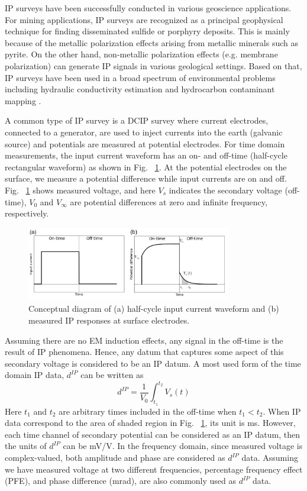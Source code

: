 \documentclass[letterpaper,11pt]{article}
\newcommand{\dip}{d^{IP}}
\begin{document}
IP surveys have been successfully conducted in various geoscience applications. For mining applications, IP surveys are recognized as a principal geophysical technique for finding disseminated sulfide or porphyry deposits. This is mainly because of the metallic polarization effects arising from metallic minerals such as pyrite. On the other hand, non-metallic polarization effects (e.g. membrane polarization) can generate IP signals in various geological settings. Based on that, IP surveys have been used  in a broad spectrum of environmental problems including hydraulic conductivity estimation and hydrocarbon contaminant mapping \cite[]{Kemna2012}. 

A common type of IP survey is a DCIP survey where current electrodes, connected to a generator, are used to inject currents into the earth (galvanic source) and potentials are measured at potential electrodes. For time domain measurements, the input current waveform has an  on- and off-time (half-cycle rectangular waveform) as shown in Fig. ~\ref{Fig:IPonoff}. At the  potential electrodes on the surface, we measure a potential difference while input currents are on and off. Fig. ~\ref{Fig:IPonoff} shows measured voltage, and here $V_s$ indicates the secondary voltage (off-time), $V_0$ and $V_{\infty}$ are potential differences at zero and infinite frequency, respectively. 
\begin{figure}[htb]
  \centering
  \includegraphics[width=0.8\textwidth]{figures/IPonoff.png}
  \caption{Conceptual diagram of (a) half-cycle input current waveform and (b) measured IP responses at surface electrodes.}
  \label{Fig:IPonoff}
\end{figure}
Assuming there are no EM induction effects, any signal in the off-time is the result of IP phenomena. Hence, any datum that captures some aspect of this secondary voltage is considered to be an IP datum. A most used form of the time domain IP data, $\dip$ can be written as  
\begin{equation}
  \dip = \frac{1}{V_0}\int_{t_1}^{t_2} V_s(t)
\end{equation}
Here $t_1$ and $t_2$ are arbitrary times included in the off-time when $t_1 < t_2$. When IP data correspond to the area of shaded region in Fig. ~\ref{Fig:IPonoff},  its unit is ms. However, each time channel of secondary potential can be considered as an IP datum, then the units of $\dip$ can be mV/V. In the frequency domain, since measured voltage is complex-valued, both amplitude and phase are considered as $\dip$ data. Assuming we have measured voltage at two different frequencies, percentage frequency effect (PFE), and phase difference (mrad), are also commonly used as $\dip$ data.  
\end{document}
